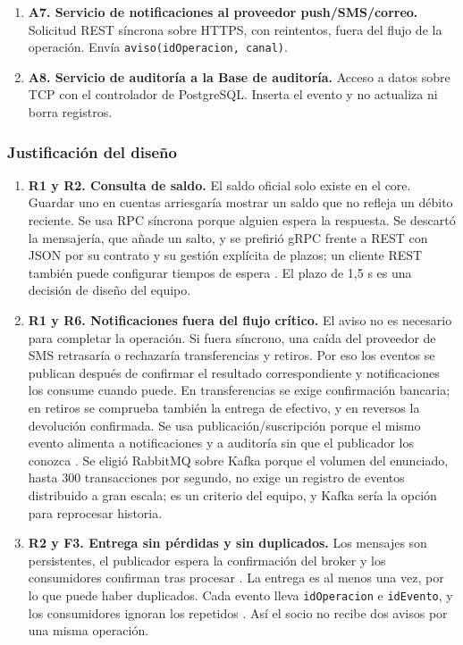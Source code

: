 \documentclass[12pt,a4paper]{article}
\begin{document}
\begin{enumerate}
    \item \textbf{A7. Servicio de notificaciones al proveedor push/SMS/correo.}
    Solicitud REST síncrona sobre HTTPS, con reintentos, fuera del flujo de la operación. Envía \texttt{aviso(idOperacion, canal)}.

    \item \textbf{A8. Servicio de auditoría a la Base de auditoría.}
    Acceso a datos sobre TCP con el controlador de PostgreSQL. Inserta el evento y no actualiza ni borra registros.
\end{enumerate}

\subsubsection{Justificación del diseño}

\begin{enumerate}
    \item \textbf{R1 y R2. Consulta de saldo.}
    El saldo oficial solo existe en el core. Guardar uno en cuentas arriesgaría mostrar un saldo que no refleja un débito reciente. Se usa RPC síncrona porque alguien espera la respuesta. Se descartó la mensajería, que añade un salto, y se prefirió gRPC frente a REST con JSON por su contrato y su gestión explícita de plazos; un cliente REST también puede configurar tiempos de espera \cite{grpcdeadlines}. El plazo de 1,5 s es una decisión de diseño del equipo.

    \item \textbf{R1 y R6. Notificaciones fuera del flujo crítico.}
    El aviso no es necesario para completar la operación. Si fuera síncrono, una caída del proveedor de SMS retrasaría o rechazaría transferencias y retiros. Por eso los eventos se publican después de confirmar el resultado correspondiente y notificaciones los consume cuando puede. En transferencias se exige confirmación bancaria; en retiros se comprueba también la entrega de efectivo, y en reversos la devolución confirmada. Se usa publicación/suscripción porque el mismo evento alimenta a notificaciones y a auditoría sin que el publicador los conozca \cite{hohpe2003}. Se eligió RabbitMQ sobre Kafka porque el volumen del enunciado, hasta 300 transacciones por segundo, no exige un registro de eventos distribuido a gran escala; es un criterio del equipo, y Kafka sería la opción para reprocesar historia.

    \item \textbf{R2 y F3. Entrega sin pérdidas y sin duplicados.}
    Los mensajes son persistentes, el publicador espera la confirmación del broker y los consumidores confirman tras procesar \cite{rabbitmqconfirms}. La entrega es al menos una vez, por lo que puede haber duplicados. Cada evento lleva \texttt{idOperacion} e \texttt{idEvento}, y los consumidores ignoran los repetidos \cite{featonbyretries}. Así el socio no recibe dos avisos por una misma operación.


\end{enumerate}
\end{document}
